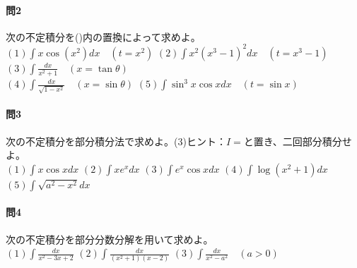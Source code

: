 \documentclass[a4j,dvipdfmx]{jsarticle}
\begin{document}
            \paragraph{問2}次の不定積分を(\hspace{1mm})内の置換によって求めよ。\\
                $(1)\displaystyle \int x\cos(x^2)dx \quad (t=x^2)$\hspace{3mm}
                $(2)\displaystyle \int x^2(x^3-1)^2dx\quad (t=x^3-1)$\hspace{3mm}
                $(3)\displaystyle \int \frac{dx}{x^2+1}\quad (x=\tan \theta)$\\
                $(4)\displaystyle \int \frac{dx}{\sqrt{1-x^2}}\quad (x=\sin \theta)$\hspace{3mm}
                $(5)\displaystyle \int \sin^3 x\cos x dx \quad(t=\sin x)$\\
            
            \paragraph{問3}次の不定積分を部分積分法で求めよ。{\scriptsize (3)ヒント：$I=$と置き、二回部分積分せよ。}\\
                $(1)\displaystyle \int x\cos xdx$\hspace{3mm}
                $(2)\displaystyle \int xe^x dx$\hspace{3mm}
                $(3)\displaystyle \int e^x\cos xdx$\hspace{3mm}
                $(4)\displaystyle \int \log(x^2+1)dx$\hspace{3mm}
                $(5)\displaystyle \int \sqrt{a^2-x^2}dx$

            \paragraph{問4}次の不定積分を部分分数分解を用いて求めよ。\\
                $(1)\displaystyle \int \frac{dx}{x^2-3x+2}$\hspace{20mm}
                $(2)\displaystyle \int \frac{dx}{(x^2+1)(x-2)}$\hspace{20mm}
                $(3)\displaystyle \int \frac{dx}{x^2-a^2}\quad (a>0)$\\
\end{document}
